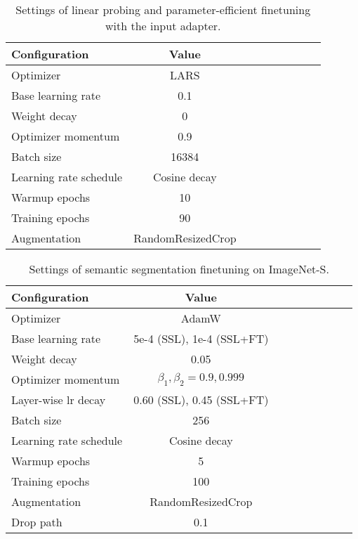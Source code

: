 \documentclass{article} \usepackage{iclr2023_conference,times}
\begin{document}
\begin{table}[]
	\centering
	\setlength{\tabcolsep}{8mm}
\caption{Settings of linear probing and parameter-efficient finetuning with the input adapter.
	}
	\small
	\begin{tabular}{lcccccccc}
		\toprule
        Configuration      & Value \\	\midrule
        Optimizer & LARS \\
        Base learning rate & 0.1 \\
        Weight decay & 0 \\
        Optimizer momentum & 0.9 \\
        Batch size & 16384 \\
        Learning rate schedule & Cosine decay \\
        Warmup epochs & 10 \\
        Training epochs & 90 \\
        Augmentation & RandomResizedCrop \\
		\bottomrule
	\end{tabular}
	\label{tab:liner_prob}
\end{table}

\begin{table}[]
	\centering
	\setlength{\tabcolsep}{8mm}
	\caption{Settings of semantic segmentation finetuning on ImageNet-S.
	}
	\small
	\begin{tabular}{lcccccccc}
		\toprule
        Configuration      & Value \\	\midrule
        Optimizer & AdamW \\
        Base learning rate & 5e-4 (SSL), 1e-4 (SSL+FT) \\
        Weight decay & 0.05 \\
        Optimizer momentum & $\beta_1, \beta_2{=}0.9, 0.999$ \\
        Layer-wise lr decay  & 0.60 (SSL), 0.45 (SSL+FT)  \\
        Batch size & 256 \\
        Learning rate schedule & Cosine decay \\
        Warmup epochs & 5 \\
        Training epochs & 100  \\
        Augmentation & RandomResizedCrop \\
        Drop path  & 0.1 \\
		\bottomrule
	\end{tabular}
	\label{tab:imagenet-seg}
\end{table}
\end{document}
